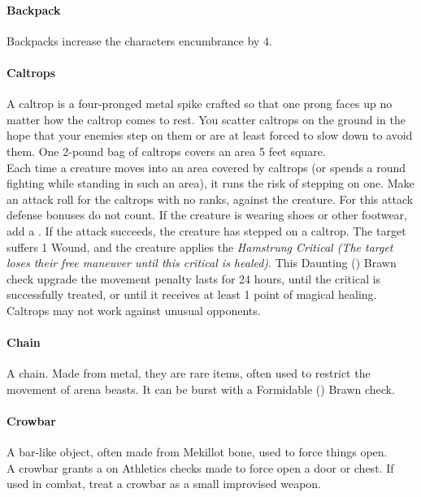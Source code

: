 \begin{multicols}{2}

\paragraph{Backpack} \label{advitm:backpack}
Backpacks increase the characters encumbrance by 4.

\paragraph{Caltrops} \label{advitm:caltrops}
A caltrop is a four-pronged metal spike crafted so that
one prong faces up no matter how the caltrop comes to
rest. You scatter caltrops on the ground in the hope that
your enemies step on them or are at least forced to slow
down to avoid them. One 2-pound bag of caltrops
covers an area 5 feet square.\\
Each time a creature moves into an area covered by
caltrops (or spends a round fighting while standing in
such an area), it runs the risk of stepping on one. Make
an attack roll for the caltrops with no ranks, against the
creature. For this attack defense bonuses do not count. If
the creature is wearing shoes or other footwear, add a
\setback. If the attack succeeds, the creature has stepped on a
caltrop. The target suffers 1 Wound, and the creature
applies the \textit{Hamstrung Critical (The target loses their
free maneuver until this critical is healed)}. This
Daunting (\difficulty\difficulty\difficulty\difficulty)
Brawn check upgrade the
movement penalty lasts for 24 hours, until the critical is
successfully treated, or until it receives at least 1 point
of magical healing.\\
Caltrops may not work against unusual opponents.

\paragraph{Chain} \label{advitm:chain}
A chain. Made from metal, they are rare items, often used to
restrict the movement of arena beasts.
It can be burst with a Formidable
(\difficulty\difficulty\difficulty\difficulty\difficulty)
Brawn check.

\paragraph{Crowbar} \label{advitm:crowbar}
A bar-like object, often made from Mekillot bone, used to
force things open.\\
A crowbar grants a \boost on Athletics checks made to force
open a door or chest. If used in combat, treat a crowbar
as a small improvised weapon.


\end{multicols}
